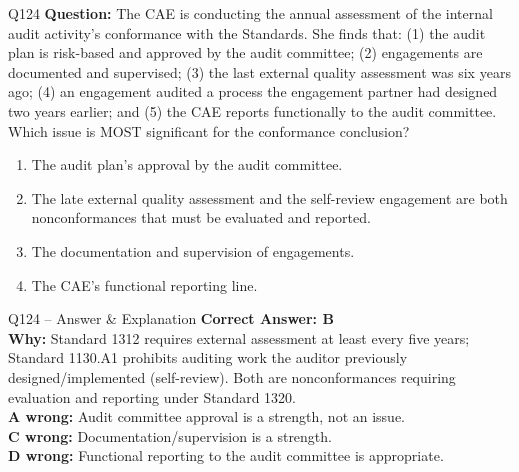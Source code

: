 \documentclass[aspectratio=169,10pt]{beamer}
\begin{document}
	\begin{frame}[t]{Q124}
		\small
		\textbf{Question:} The CAE is conducting the annual assessment of the internal audit activity's conformance with the Standards. She finds that: (1) the audit plan is risk-based and approved by the audit committee; (2) engagements are documented and supervised; (3) the last external quality assessment was six years ago; (4) an engagement audited a process the engagement partner had designed two years earlier; and (5) the CAE reports functionally to the audit committee. Which issue is MOST significant for the conformance conclusion?
		\begin{enumerate}[label=\Alph*.,itemsep=1pt,topsep=2pt]
			\item The audit plan's approval by the audit committee.
			\item The late external quality assessment and the self-review engagement are both nonconformances that must be evaluated and reported.
			\item The documentation and supervision of engagements.
			\item The CAE's functional reporting line.
		\end{enumerate}
	\end{frame}
	
	\begin{frame}[t]{Q124 -- Answer \& Explanation}
		\small
		\textbf{Correct Answer: B} \\[4pt]
		\textbf{Why:} Standard 1312 requires external assessment at least every five years; Standard 1130.A1 prohibits auditing work the auditor previously designed/implemented (self-review). Both are nonconformances requiring evaluation and reporting under Standard 1320. \\[4pt]
		\textbf{A wrong:} Audit committee approval is a strength, not an issue. \\[2pt]
		\textbf{C wrong:} Documentation/supervision is a strength. \\[2pt]
		\textbf{D wrong:} Functional reporting to the audit committee is appropriate.
	\end{frame}
	
\end{document}
